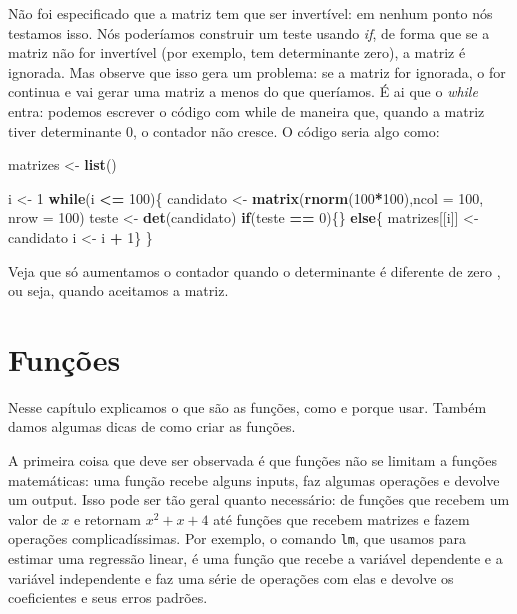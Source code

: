 \documentclass[]{book}
\newenvironment{Shaded}{\begin{snugshade}}{\end{snugshade}}
\newcommand{\KeywordTok}[1]{\textcolor[rgb]{0.13,0.29,0.53}{\textbf{#1}}}
\newcommand{\DataTypeTok}[1]{\textcolor[rgb]{0.13,0.29,0.53}{#1}}
\newcommand{\DecValTok}[1]{\textcolor[rgb]{0.00,0.00,0.81}{#1}}
\newcommand{\StringTok}[1]{\textcolor[rgb]{0.31,0.60,0.02}{#1}}
\newcommand{\ControlFlowTok}[1]{\textcolor[rgb]{0.13,0.29,0.53}{\textbf{#1}}}
\newcommand{\OperatorTok}[1]{\textcolor[rgb]{0.81,0.36,0.00}{\textbf{#1}}}
\newcommand{\NormalTok}[1]{#1}
\begin{document}
Não foi especificado que a matriz tem que ser invertível: em nenhum
ponto nós testamos isso. Nós poderíamos construir um teste usando
\emph{if}, de forma que se a matriz não for invertível (por exemplo, tem
determinante zero), a matriz é ignorada. Mas observe que isso gera um
problema: se a matriz for ignorada, o for continua e vai gerar uma
matriz a menos do que queríamos. É ai que o \emph{while} entra: podemos
escrever o código com while de maneira que, quando a matriz tiver
determinante 0, o contador não cresce. O código seria algo como:

\begin{Shaded}
\begin{Highlighting}[]
\NormalTok{ matrizes <-}\StringTok{ }\KeywordTok{list}\NormalTok{()}
 
\NormalTok{ i <-}\StringTok{ }\DecValTok{1}
 \ControlFlowTok{while}\NormalTok{(i }\OperatorTok{<=}\StringTok{ }\DecValTok{100}\NormalTok{)\{}
\NormalTok{ candidato <-}\StringTok{ }\KeywordTok{matrix}\NormalTok{(}\KeywordTok{rnorm}\NormalTok{(}\DecValTok{100}\OperatorTok{*}\DecValTok{100}\NormalTok{),}\DataTypeTok{ncol =} \DecValTok{100}\NormalTok{, }\DataTypeTok{nrow =} \DecValTok{100}\NormalTok{)}
\NormalTok{ teste <-}\StringTok{ }\KeywordTok{det}\NormalTok{(candidato)}
 \ControlFlowTok{if}\NormalTok{(teste }\OperatorTok{==}\StringTok{ }\DecValTok{0}\NormalTok{)\{\} }\ControlFlowTok{else}\NormalTok{\{}
\NormalTok{ matrizes[[i]] <-}\StringTok{ }\NormalTok{candidato}
\NormalTok{ i <-}\StringTok{ }\NormalTok{i }\OperatorTok{+}\StringTok{ }\DecValTok{1}\NormalTok{\}}
\NormalTok{ \}}
\end{Highlighting}
\end{Shaded}

Veja que só aumentamos o contador quando o determinante é diferente de
zero , ou seja, quando aceitamos a matriz.

\chapter{Funções}\label{funcoes}

Nesse capítulo explicamos o que são as funções, como e porque usar.
Também damos algumas dicas de como criar as funções.

A primeira coisa que deve ser observada é que funções não se limitam a
funções matemáticas: uma função recebe alguns inputs, faz algumas
operações e devolve um output. Isso pode ser tão geral quanto
necessário: de funções que recebem um valor de \(x\) e retornam
\(x^2+x+4\) até funções que recebem matrizes e fazem operações
complicadíssimas. Por exemplo, o comando \texttt{lm}, que usamos para
estimar uma regressão linear, é uma função que recebe a variável
dependente e a variável independente e faz uma série de operações com
elas e devolve os coeficientes e seus erros padrões.
\end{document}
